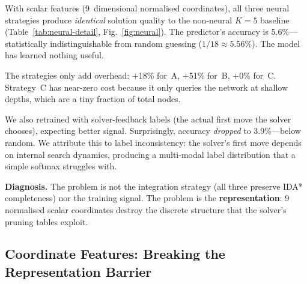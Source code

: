 \documentclass[graybox]{svmult}
\begin{document}
With scalar features (9~dimensional normalised coordinates), all three neural strategies produce \emph{identical} solution quality to the non-neural $K{=}5$ baseline (Table~\ref{tab:neural-detail}, Fig.~\ref{fig:neural}). The predictor's accuracy is 5.6\%---statistically indistinguishable from random guessing ($1/18 \approx 5.56\%$). The model has learned nothing useful.

\begin{table}[!t]
\centering
\caption{Neural strategies with scalar features (200 scrambles, $K{=}5$).}
\label{tab:neural-detail}
\end{table}

The strategies only add overhead: +18\% for~A, +51\% for~B, +0\% for~C. Strategy~C has near-zero cost because it only queries the network at shallow depths, which are a tiny fraction of total nodes.

We also retrained with solver-feedback labels (the actual first move the solver chooses), expecting better signal. Surprisingly, accuracy \emph{dropped} to 3.9\%---below random. We attribute this to label inconsistency: the solver's first move depends on internal search dynamics, producing a multi-modal label distribution that a simple softmax struggles with.

\textbf{Diagnosis.} The problem is not the integration strategy (all three preserve IDA* completeness) nor the training signal. The problem is the \textbf{representation}: 9 normalised scalar coordinates destroy the discrete structure that the solver's pruning tables exploit.

\subsection{Coordinate Features: Breaking the Representation Barrier}
\label{sec:coord-features}
\end{document}
